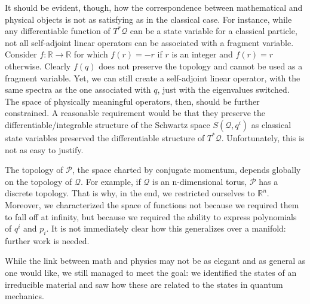 \documentclass[smallextended]{svjour3}
\numberwithin{equation}{section}
\theoremstyle{definition}
\begin{document}
It should be evident, though, how the correspondence between mathematical and physical objects is not as satisfying as in the classical case. For instance, while any differentiable function of $T^*\mathcal{Q}$ can be a state variable for a classical particle, not all self-adjoint linear operators can be associated with a fragment variable. Consider $f: \mathbb{R} \rightarrow \mathbb{R}$ for which $f(r) = -r$ if $r$ is an integer and $f(r) = r$ otherwise. Clearly $f(q)$ does not preserve the topology and cannot be used as a fragment variable. Yet, we can still create a self-adjoint linear operator, with the same spectra as the one associated with $q$, just with the eigenvalues switched. The space of physically meaningful operators, then, should be further constrained. A reasonable requirement would be that they preserve the differentiable/integrable structure of the Schwartz space $S(\mathcal{Q}, q^i)$ as classical state variables preserved the differentiable structure of $T^*\mathcal{Q}$. Unfortunately, this is not as easy to justify.

The topology of $\mathcal{P}$, the space charted by conjugate momentum, depends globally on the topology of $\mathcal{Q}$. For example, if $\mathcal{Q}$ is an n-dimensional torus, $\mathcal{P}$ has a discrete topology. That is why, in the end, we restricted ourselves to $\mathbb{R}^n$. Moreover, we characterized the space of functions not because we required them to fall off at infinity, but because we required the ability to express polynomials of $q^i$ and $p_i$. It is not immediately clear how this generalizes over a manifold: further work is needed.

While the link between math and physics may not be as elegant and as general as one would like, we still managed to meet the goal: we identified the states of an irreducible material and saw how these are related to the states in quantum mechanics.


\end{document}

